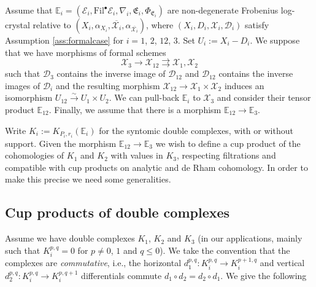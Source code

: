 \documentclass[asterisque,english]{smfart}
\begin{document}
Assume that $\mathbb{E}_{i}=\left( \mathcal{E}_{i},\mathrm{Fil}^{\bullet }
\mathcal{E}_{i},\nabla _{i},\mathfrak{E}_{i},\Phi _{\mathfrak{E}_{i}}\right) 
$ are non-degenerate Frobenius log-crystal relative to $\left( X_{i},\alpha
_{X_{i}},\overline{\mathcal{X}_{i}},\alpha _{\overline{\mathcal{X}_{i}}
}\right) $, where $\left(X_i,D_i, \mathcal{X}_{i},\mathcal{D}_{i}\right) $ satisfy
Assumption \ref{ass:formalcase} for $i=1$, $2$, $12$, $3$. Set $U_{i}:=X_{i}-D_{i}$. We suppose that we have morphisms of formal
schemes
\begin{equation*}
\mathcal{X}_{3}\longrightarrow \mathcal{X}_{12}\rightrightarrows \mathcal{X}
_{1},\mathcal{X}_{2}
\end{equation*}
such that $\mathcal{D}_{3}$ contains the inverse image of $\mathcal{D}_{12}$
and $\mathcal{D}_{12}$ contains the inverse images of $\mathcal{D}_{i}$ and
the resulting morphism $\mathcal{X}_{12}\rightarrow \mathcal{X}_{1}\times 
\mathcal{X}_{2}$ induces an isomorphism $U_{12}\overset{\sim }{\rightarrow }
U_{1}\times U_{2}$. We can pull-back $\mathbb{E}_{i}$ to $\mathcal{X}_{3}$
and consider their tensor product $\mathbb{E}_{12}$. Finally, we assume that
there is a morphism $\mathbb{E}_{12}\rightarrow \mathbb{E}_{3}$. 

Write $K_i:=K_{P_i,r_i}(\mathbb{E}_i)$ for the syntomic double complexes, with or without  support.
Given the morphism $\mathbb{E}_{12}\rightarrow \mathbb{E}_{3}$ we wish to define a cup product of the cohomologies of $K_1$ and $K_2$ with values in $K_3$, respecting filtrations and compatible with cup products on analytic and de Rham cohomology. In order to make this precise we need some generalities.

\subsection{Cup products of double complexes}


Assume we have double complexes $K_1$, $K_2$ and $K_3$ (in our applications, mainly such that $K_i^{p,q}=0$ for $p\neq 0$, $1$ and $q\leq 0$).
We take the convention that the complexes are {\em commutative}, i.e., the horizontal $d_1^{p,q}:K_i^{p,q} \rightarrow K_i^{p+1,q}$ and vertical $d_2^{p,q}:K_i^{p,q} \rightarrow K_i^{p,q+1}$ differentials commute $d_1\circ d_2=d_2\circ d_1$. We give the following
\end{document}
